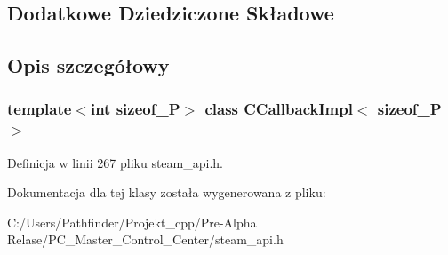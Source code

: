 \subsection*{Dodatkowe Dziedziczone Składowe}


\subsection{Opis szczegółowy}
\subsubsection*{template$<$int sizeof\+\_\+P$>$\newline
class C\+Callback\+Impl$<$ sizeof\+\_\+\+P $>$}



Definicja w linii 267 pliku steam\+\_\+api.\+h.



Dokumentacja dla tej klasy została wygenerowana z pliku\+:\begin{DoxyCompactItemize}
\item 
C\+:/\+Users/\+Pathfinder/\+Projekt\+\_\+cpp/\+Pre-\/\+Alpha Relase/\+P\+C\+\_\+\+Master\+\_\+\+Control\+\_\+\+Center/steam\+\_\+api.\+h\end{DoxyCompactItemize}

